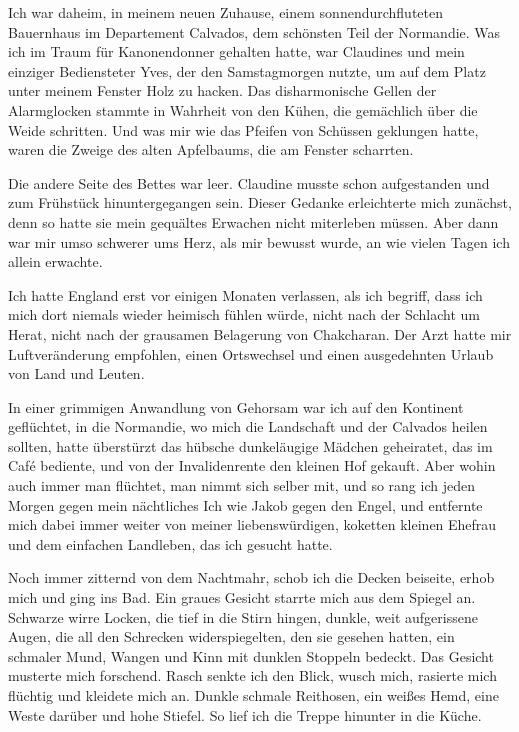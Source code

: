 Ich war daheim, in meinem neuen Zuhause, einem sonnendurchfluteten
Bauernhaus im Departement Calvados, dem schönsten Teil der
Normandie. Was ich im Traum für Kanonendonner gehalten hatte, war
Claudines und mein einziger Bediensteter Yves, der den
Samstagmorgen nutzte, um auf dem Platz unter meinem Fenster Holz zu
hacken. Das disharmonische Gellen der Alarmglocken stammte in
Wahrheit von den Kühen, die gemächlich über die Weide schritten.
Und was mir wie das Pfeifen von Schüssen geklungen hatte, waren die
Zweige des alten Apfelbaums, die am Fenster scharrten.

Die andere Seite des Bettes war leer. Claudine musste schon
aufgestanden und zum Frühstück hinuntergegangen sein. Dieser
Gedanke erleichterte mich zunächst, denn so hatte sie mein
gequältes Erwachen nicht miterleben müssen. Aber dann war mir umso
schwerer ums Herz, als mir bewusst wurde, an wie vielen Tagen ich
allein erwachte.

\bigpar

Ich hatte England erst vor einigen Monaten verlassen, als ich
begriff, dass ich mich dort niemals wieder heimisch fühlen würde,
nicht nach der Schlacht um Herat, nicht nach der grausamen
Belagerung von Chakcharan. Der Arzt hatte mir Luftveränderung
empfohlen, einen Ortswechsel und einen ausgedehnten Urlaub von Land
und Leuten.

In einer grimmigen Anwandlung von Gehorsam war ich auf den
Kontinent geflüchtet, in die Normandie, wo mich die Landschaft und
der Calvados heilen sollten, hatte überstürzt das hübsche
dunkeläugige Mädchen geheiratet, das im Café bediente, und von der
Invalidenrente den kleinen Hof gekauft. Aber wohin auch immer man
flüchtet, man nimmt sich selber mit, und so rang ich jeden Morgen
gegen mein nächtliches Ich wie Jakob gegen den Engel, und entfernte
mich dabei immer weiter von meiner liebenswürdigen, koketten
kleinen Ehefrau und dem einfachen Landleben, das ich gesucht
hatte.

\bigpar

Noch immer zitternd von dem Nachtmahr, schob ich die Decken
beiseite, erhob mich und ging ins Bad. Ein graues Gesicht starrte
mich aus dem Spiegel an. Schwarze wirre Locken, die tief in die
Stirn hingen, dunkle, weit aufgerissene Augen, die all den
Schrecken widerspiegelten, den sie gesehen hatten, ein schmaler
Mund, Wangen und Kinn mit dunklen Stoppeln bedeckt. Das Gesicht
musterte mich forschend. Rasch senkte ich den Blick, wusch mich,
rasierte mich flüchtig und kleidete mich an. Dunkle schmale
Reithosen, ein weißes Hemd, eine Weste darüber und hohe Stiefel. So
lief ich die Treppe hinunter in die Küche.

